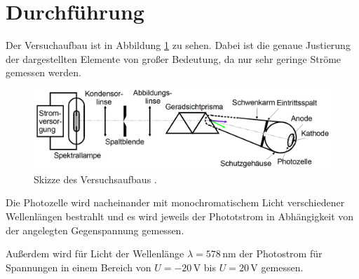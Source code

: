 \section{Durchführung}
\label{sec:Durchführung}

Der Versuchaufbau ist in Abbildung \ref{fig:aufbau} zu sehen. Dabei ist die  genaue Justierung
der dargestellten Elemente von großer Bedeutung, da nur sehr geringe Ströme gemessen
werden.

\begin{figure}
  \centering
  \includegraphics[width=\textwidth]{data/aufbau.png}
  \caption{Skizze des Versuchsaufbaus \cite{Versuchsanleitung}.}
  \label{fig:aufbau}
\end{figure}

Die Photozelle wird nacheinander mit monochromatischem Licht verschiedener Wellenlängen
bestrahlt und es wird jeweils der Phototstrom in Abhängigkeit von der angelegten
Gegenspannung gemessen.

Außerdem wird für Licht der Wellenlänge $\lambda=578\,$nm der Photostrom für Spannungen
in einem Bereich von $U=-20\,$V bis $U=20\,$V gemessen.
